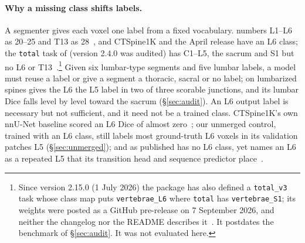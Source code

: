 \paragraph{Why a missing class shifts labels.}
A segmenter gives each voxel one label from a fixed vocabulary. \VerSe{} numbers L1--L6 as
20--25 and T13 as 28~\citep{VerSeRepo}, and CTSpine1K and the April release have an L6 class;
the \texttt{total} task of \TS{} (version 2.4.0 was audited) has C1--L5, the sacrum and S1 but
no L6 or T13~\citep{Wasserthal2023TotalSegmentator:Images,TotalSegmentatorCode}.\footnote{Since
version 2.15.0 (1 July 2026) the \TS{} package has also defined a \texttt{total\_v3} task whose
class map puts \texttt{vertebrae\_L6} where \texttt{total} has \texttt{vertebrae\_S1}; its
weights were posted as a GitHub pre-release on 7 September 2026, and neither the changelog
nor the README describes it~\citep{TotalSegmentatorCode}. It postdates the
benchmark of \S\ref{sec:audit}. It was not evaluated here.} Given
six lumbar-type segments and five lumbar labels, a model must reuse a label or give a segment
a thoracic, sacral or no label; on lumbarized spines \TS{} gives the L6 the L5 label in two of
three scorable junctions, and its lumbar Dice falls level by level toward the sacrum
(\S\ref{sec:audit}). An L6 output label is necessary but not sufficient, and it need not be a
trained class. CTSpine1K's own nnU-Net baseline scored an L6 Dice of almost
zero~\citep{Deng2021CTSpine1K:Tomography}; our unmerged control, trained with an L6
class, still labels most ground-truth L6 voxels in its validation patches L5
(\S\ref{sec:unmerged}); and \VERIDAH{} as published has no L6 class, yet names an L6 as a
repeated L5 that its transition head and sequence predictor
place~\citep{Moller2026VERIDAH:Sequences}.

